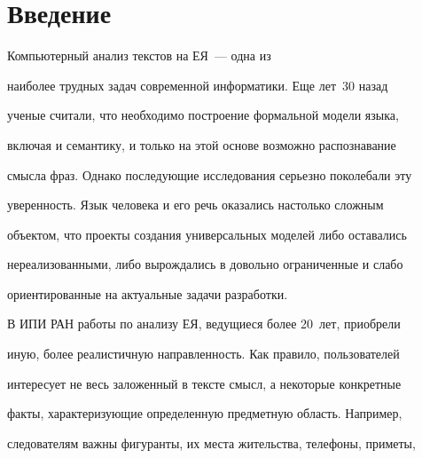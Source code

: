 







      \thispagestyle{headings}





      


            \label{st\stat}


            


            \vspace*{-18pt}





   \section*{Введение}


   


   Компьютерный анализ текстов на ЕЯ~--- одна из 


наиболее трудных задач современной информатики. Еще лет~30 назад 


ученые считали, что необходимо  построение формальной модели языка, 


включая и семантику, и только на этой основе возможно распознавание 


смысла фраз. Однако последующие исследования серьезно поколебали эту 


уверенность. Язык человека и его речь оказались настолько сложным 


объектом, что проекты создания универсальных моделей либо оставались 


нереализованными, либо вырождались в довольно ограниченные и слабо 


ориентированные на актуальные задачи разработки. 


   


   В ИПИ РАН работы по анализу ЕЯ, ведущиеся более 20~лет, приобрели 


иную, более реалистичную направленность. Как правило, пользователей 


интересует не весь заложенный в тексте смысл, а некоторые конкретные 


факты, характеризующие определенную предметную область. Например, 


следователям важны фигуранты, их места жительства, телефоны, приметы, 


